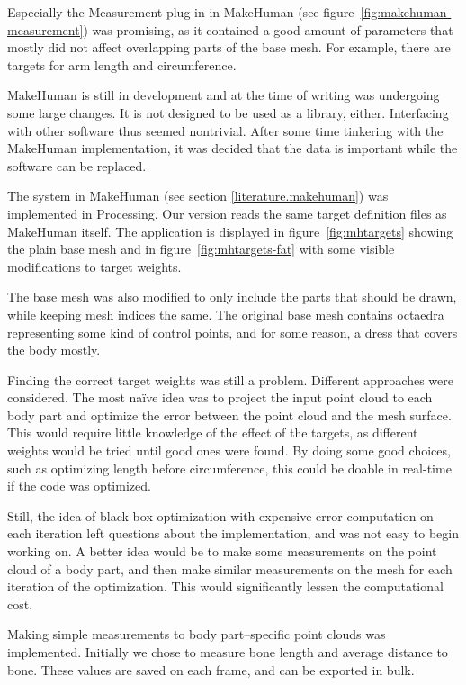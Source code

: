 Especially the Measurement plug-in in MakeHuman (see figure~\ref{fig:makehuman-measurement}) was promising, as it contained a good amount of parameters that mostly did not affect overlapping parts of the base mesh. For example, there are targets for arm length and circumference.

MakeHuman is still in development and at the time of writing was undergoing some large changes. It is not designed to be used as a library, either. Interfacing with other software thus seemed nontrivial. After some time tinkering with the MakeHuman implementation, it was decided that the data is important while the software can be replaced.

The  system in MakeHuman (see section \ref{literature.makehuman}) was implemented in Processing. Our version reads the same target definition files as MakeHuman itself. The application is displayed in figure~\ref{fig:mhtargets} showing the plain base mesh and in figure~\ref{fig:mhtargets-fat} with some visible modifications to target weights.

The base mesh was also modified to only include the parts that should be drawn, while keeping mesh indices the same. The original base mesh contains octaedra representing some kind of control points, and for some reason, a dress that covers the body mostly.

\newtopic

Finding the correct target weights was still a problem. Different approaches were considered. The most naïve idea was to project the input point cloud to each body part and optimize the error between the point cloud and the mesh surface. This would require little knowledge of the effect of the targets, as different weights would be tried until good ones were found. By doing some good choices, such as optimizing length before circumference, this could be doable in real-time if the code was optimized.

Still, the idea of black-box optimization with expensive error computation on each iteration left questions about the implementation, and was not easy to begin working on. A better idea would be to make some measurements on the point cloud of a body part, and then make similar measurements on the mesh for each iteration of the optimization. This would significantly lessen the computational cost.

Making simple measurements to body part--specific point clouds was implemented. Initially we chose to measure bone length and average distance to bone. These values are saved on each frame, and can be exported in bulk.

